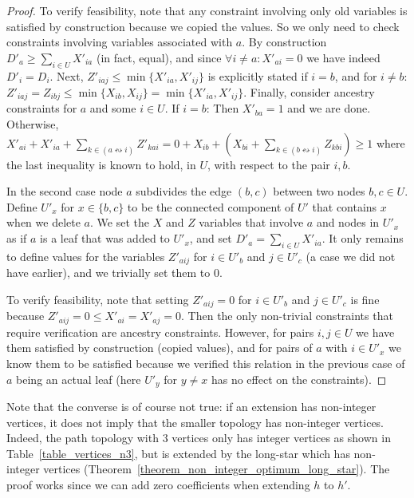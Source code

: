 \begin{proof}
To verify feasibility, note that any constraint involving only old variables is satisfied by construction because we copied the values. So we only need to check constraints involving variables associated with $a$. By construction $D'_a \ge \sum_{i \in U}{X'_{ia}}$ (in fact, equal), and since $\forall i \ne a: X'_{ai}=0$ we have indeed $D'_i = D_i$. Next, $Z'_{iaj} \le \min\{ X'_{ia},X'_{ij} \}$ is explicitly stated if $i=b$, and for $i \ne b$: $Z'_{iaj} = Z_{ibj} \le \min\{ X_{ib},X_{ij} \} = \min\{ X'_{ia},X'_{ij} \}$. Finally,
consider ancestry constraints for $a$ and some $i \in U$. If $i=b$: Then $X'_{ba} = 1$ and we are done. Otherwise, $X'_{ai} + X'_{ia} + \sum_{k \in (a \leftrightsquigarrow i)}{Z'_{kai}} = 0 + X_{ib} + (X_{bi} + \sum_{k \in (b \leftrightsquigarrow i)}{Z_{kbi}}) \ge 1$ where the last inequality is known to hold, in $U$, with respect to the pair $i,b$.

In the second case node $a$ subdivides the edge $(b,c)$ between two nodes $b,c \in U$. Define $U'_x$ for $x \in \{b,c\}$ to be the connected component of $U'$ that contains $x$ when we delete $a$. We set the $X$ and $Z$ variables that involve $a$ and nodes in $U'_x$ as if $a$ is a leaf that was added to $U'_x$, and set $D'_a = \sum_{i \in U}{X'_{ia}}$. It only remains to define values for the variables  $Z'_{aij}$ for $i \in U'_b$ and $j \in U'_c$ (a case we did not have earlier), and we trivially set them to $0$.

To verify feasibility, note that setting $Z'_{aij} = 0$ for $i \in U'_b$ and $j \in U'_c$ is fine because $Z'_{aij} = 0 \le X'_{ai} = X'_{aj}  = 0$. Then the only non-trivial constraints that require verification are ancestry constraints. However, for pairs $i,j \in U$ we have them satisfied by construction (copied values), and for pairs of $a$ with $i \in U'_x$ we know them to be satisfied because we verified this relation in the previous case of $a$ being an actual leaf (here $U'_y$ for $y \ne x$ has no effect on the constraints).
\end{proof}

\begin{remark}
\label{remark_subgraph_notes}
Note that the converse is of course not true: if an extension has non-integer vertices, it does not imply that the smaller topology has non-integer vertices. Indeed, the path topology with $3$ vertices only has integer vertices as shown in Table~\ref{table_vertices_n3}, but is extended by the long-star which has non-integer vertices (Theorem~\ref{theorem_non_integer_optimum_long_star}). The proof works since we can add zero coefficients when extending $h$ to $h'$.
\end{remark}


